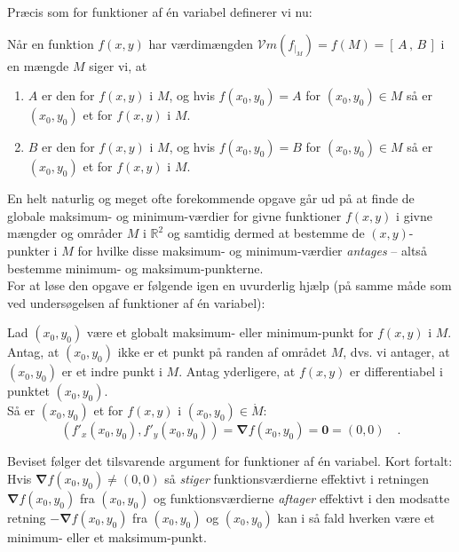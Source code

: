 Præcis som for funktioner af \'{e}n variabel definerer vi nu:

\begin{definition} 
Når en funktion $f(x,y)$ har værdimængden $\mathcal{V}m(f_{|_{M}}) = f(M) = [\, A \, , \, B \, ]$ i en mængde $M$ siger vi, at
\begin{enumerate}
\item $A$ er den  for $f(x,y)$ i $M$, og hvis $f(x_{0}, y_{0})= A$ for $(x_{0}, y_{0}) \in M$ så er $(x_{0}, y_{0})$ et  for $f(x,y)$ i $M$.
\item $B$ er den  for $f(x,y)$ i $M$, og hvis $f(x_{0}, y_{0})= B$ for $(x_{0}, y_{0}) \in M$ så er $(x_{0}, y_{0})$ et  for $f(x,y)$ i $M$.
\end{enumerate}
\end{definition}

En helt naturlig og meget ofte forekommende opgave går ud på at finde de globale maksimum- og minimum-værdier for givne funktioner $f(x,y)$ i givne mængder og områder $M$ i $\mathbb{R}^{2}$ og samtidig dermed at bestemme de $(x,y)$-punkter i $M$  for hvilke
disse maksimum- og minimum-værdier {\textit{antages}} -- altså bestemme minimum- og maksimum-punkterne. \\

 For at løse den opgave er følgende igen en uvurderlig hjælp (på samme måde som ved undersøgelsen af funktioner af \'{e}n variabel):

\begin{lemma}\label{lemmaMaksMin2Var}
Lad $(x_{0}, y_{0})$ være et globalt maksimum- eller minimum-punkt for $f(x,y)$ i $M$. \\

 Antag, at  $(x_{0}, y_{0})$ ikke er et punkt på randen af området $M$, dvs. vi antager, at $(x_{0}, y_{0})$ er et indre punkt i $M$. Antag yderligere, at $f(x,y)$ er differentiabel i punktet $(x_{0}, y_{0})$.\\

 Så er
$(x_{0}, y_{0})$ et  for $f(x,y)$ i $(x_{0}, y_{0}) \in \mathring{M}$:
\begin{equation}
(f'_{x}(x_{0}, y_{0}), f'_{y}(x_{0}, y_{0})) = \bm{\nabla}f(x_{0}, y_{0}) = \mathbf{0} = (0,0) \quad .
\end{equation}
\end{lemma}
\begin{bevis}
Beviset følger det tilsvarende argument for funktioner af \'{e}n variabel. Kort fortalt: Hvis $\bm{\nabla}f(x_{0}, y_{0}) \neq (0,0)$ så {\textit{stiger}} funktionsværdierne effektivt i retningen $\bm{\nabla}f(x_{0}, y_{0})$ fra $(x_{0}, y_{0})$ og funktionsværdierne {\textit{aftager}} effektivt i den modsatte retning $-\bm{\nabla}f(x_{0}, y_{0})$ fra $(x_{0}, y_{0})$ og $(x_{0}, y_{0})$ kan i så fald hverken være et minimum- eller et maksimum-punkt.
\end{bevis}


